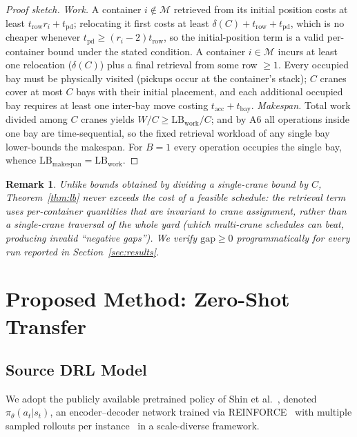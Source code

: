 \documentclass[11pt,a4paper]{elsarticle}
\newtheorem{remark}{Remark}[section]
\newcommand{\LB}{\text{LB}}
\begin{document}
\begin{proof}[Proof sketch]
\emph{Work.} A container $i \notin \mathcal{M}$ retrieved from its initial position costs at least $t_{\text{row}} r_i + t_{\text{pd}}$; relocating it first costs at least $\delta(C) + t_{\text{row}} + t_{\text{pd}}$, which is no cheaper whenever $t_{\text{pd}} \ge (r_i - 2) t_{\text{row}}$, so the initial-position term is a valid per-container bound under the stated condition. A container $i \in \mathcal{M}$ incurs at least one relocation ($\delta(C)$) plus a final retrieval from some row $\ge 1$. Every occupied bay must be physically visited (pickups occur at the container's stack); $C$ cranes cover at most $C$ bays with their initial placement, and each additional occupied bay requires at least one inter-bay move costing $t_{\text{acc}} + t_{\text{bay}}$. \emph{Makespan.} Total work divided among $C$ cranes yields $W/C \ge \LB_{\text{work}}/C$; and by A6 all operations inside one bay are time-sequential, so the fixed retrieval workload of any single bay lower-bounds the makespan. For $B=1$ every operation occupies the single bay, whence $\LB_{\text{makespan}} = \LB_{\text{work}}$.
\end{proof}

\begin{remark}
\label{rem:lb}
Unlike bounds obtained by dividing a single-crane bound by $C$, Theorem~\ref{thm:lb} never exceeds the cost of a feasible schedule: the retrieval term uses per-container quantities that are invariant to crane assignment, rather than a single-crane traversal of the whole yard (which multi-crane schedules can beat, producing invalid ``negative gaps''). We verify $\text{gap} \ge 0$ programmatically for every run reported in Section~\ref{sec:results}.
\end{remark}

\section{Proposed Method: Zero-Shot Transfer}
\label{sec:method}

\subsection{Source DRL Model}

We adopt the publicly available pretrained policy of Shin et al.~\cite{shin2026}, denoted $\pi_\theta(a_t|s_t)$, an encoder--decoder network trained via REINFORCE~\cite{williams1992} with multiple sampled rollouts per instance~\cite{kwon2020} in a scale-diverse framework.
\end{document}
